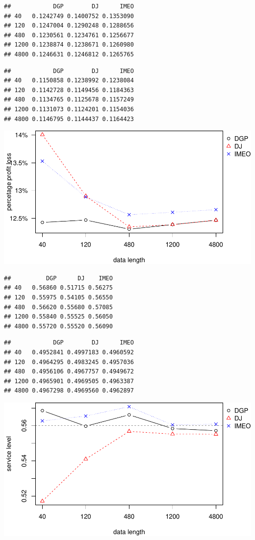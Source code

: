 \documentclass[
]{article}
\begin{document}
\begin{verbatim}
##            DGP        DJ      IMEO
## 40   0.1242749 0.1400752 0.1353090
## 120  0.1247004 0.1290248 0.1288656
## 480  0.1230561 0.1234761 0.1256677
## 1200 0.1238874 0.1238671 0.1260980
## 4800 0.1246631 0.1246812 0.1265765
\end{verbatim}

\begin{verbatim}
##            DGP        DJ      IMEO
## 40   0.1150858 0.1238992 0.1238084
## 120  0.1142728 0.1149456 0.1184363
## 480  0.1134765 0.1125678 0.1157249
## 1200 0.1131073 0.1124201 0.1154036
## 4800 0.1146795 0.1144437 0.1164423
\end{verbatim}

\includegraphics{information_non-plot_files/figure-latex/SAR(3)(1)_4ppl-1.pdf}

\begin{verbatim}
##          DGP      DJ    IMEO
## 40   0.56860 0.51715 0.56275
## 120  0.55975 0.54105 0.56550
## 480  0.56620 0.55680 0.57085
## 1200 0.55840 0.55525 0.56050
## 4800 0.55720 0.55520 0.56090
\end{verbatim}

\begin{verbatim}
##            DGP        DJ      IMEO
## 40   0.4952841 0.4997183 0.4960592
## 120  0.4964295 0.4983245 0.4957036
## 480  0.4956106 0.4967757 0.4949672
## 1200 0.4965901 0.4969505 0.4963387
## 4800 0.4967298 0.4969560 0.4962897
\end{verbatim}

\includegraphics{information_non-plot_files/figure-latex/SAR(3)(1)_4sl-1.pdf}
\end{document}

